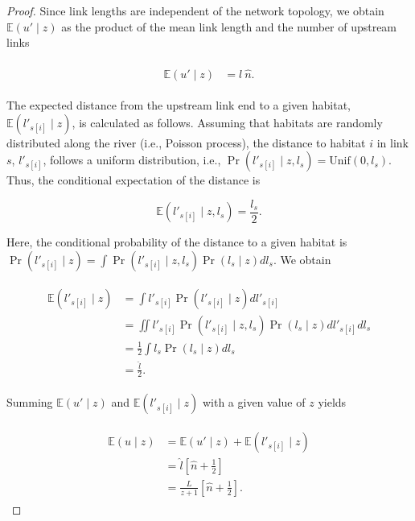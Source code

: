 \documentclass[11pt, class=article, crop=false]{standalone}
\theoremstyle{definition}
\begin{document}
\begin{proof}
Since link lengths are independent of the network topology, we obtain $\mathbb{E}(u' \mid z)$ as the product of the mean link length and the number of upstream links

\begin{align}
    \begin{split}
        \mathbb{E}(u' \mid z) 
        &= \hat{l}~\hat{n}.
    \end{split}
\end{align}

The expected distance from the upstream link end to a given habitat, $\mathbb{E}(l'_{s[i]}\mid z)$, is calculated as follows.
Assuming that habitats are randomly distributed along the river (i.e., Poisson process), the distance to habitat $i$ in link $s$, $l'_{s[i]}$, follows a uniform distribution, i.e.,  $\Pr(l'_{s[i]}\mid z, l_s) = \mathrm{Unif}(0, l_s)$.
Thus, the conditional expectation of the distance is

\begin{equation}
    \mathbb{E}(l'_{s[i]}\mid z, l_s) = \frac{l_s}{2}.
\end{equation}

Here, the conditional probability of the distance to a given habitat is $\Pr(l'_{s[i]}\mid z)= \int \Pr(l'_{s[i]}\mid z, l_s) \Pr(l_s\mid z)d l_s$.
We obtain 

\begin{align}
    \begin{split}
        \mathbb{E}(l'_{s[i]}\mid z)
        &= \int l'_{s[i]} \Pr(l'_{s[i]}\mid z) dl'_{s[i]}\\
        &= \iint l'_{s[i]} \Pr(l'_{s[i]}\mid z, l_s) \Pr(l_s\mid z) dl'_{s[i]} dl_s \\
        &= \frac{1}{2} \int l_s \Pr(l_s\mid z) dl_s \\
        &= \frac{\hat{l}}{2}.
    \end{split}
\end{align}

Summing $\mathbb{E}(u' \mid z)$ and $\mathbb{E}(l'_{s[i]}\mid z)$ with a given value of $z$ yields

\begin{align}
    \begin{split}
        \mathbb{E}(u \mid z) 
        &= \mathbb{E}(u' \mid z) + \mathbb{E}(l'_{s[i]}\mid z)\\
        &= \hat{l} \left[ \hat{n} + \frac{1}{2} \right]\\
        &= \frac{L}{z+1} \left[ \hat{n} + \frac{1}{2} \right].
    \end{split}
    \label{eq:cu}
\end{align}


\end{proof}
\end{document}

